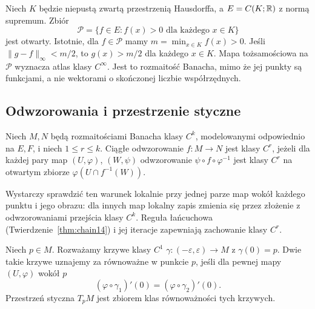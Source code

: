 \begin{przyklad}
\label{ex:fsg-positive-functions}
Niech $K$ będzie niepustą zwartą przestrzenią Hausdorffa,
a $E=C(K;\mathbb R)$ z normą supremum. Zbiór
\[
 \mathcal P=\{f\in E:f(x)>0\text{ dla każdego }x\in K\}
\]
jest otwarty. Istotnie, dla $f\in\mathcal P$ mamy
$m=\min_{x\in K}f(x)>0$. Jeśli $\|g-f\|_\infty<m/2$,
to $g(x)>m/2$ dla każdego $x\in K$. Mapa tożsamościowa
na $\mathcal P$ wyznacza atlas klasy $C^\infty$.
Jest to rozmaitość Banacha, mimo że jej punkty są funkcjami,
a nie wektorami o skończonej liczbie współrzędnych.
\end{przyklad}

\subsection{Odwzorowania i przestrzenie styczne}

\begin{definicja}
\label{def:fsg-smooth-map}
Niech $M,N$ będą rozmaitościami Banacha klasy $C^k$,
modelowanymi odpowiednio na $E,F$, i niech $1\le r\le k$.
Ciągłe odwzorowanie $f:M\to N$ jest klasy $C^r$, jeżeli
dla każdej pary map $(U,\varphi)$, $(W,\psi)$
odwzorowanie
$\psi\circ f\circ\varphi^{-1}$ jest klasy $C^r$
na otwartym zbiorze $\varphi(U\cap f^{-1}(W))$.
\end{definicja}

Wystarczy sprawdzić ten warunek lokalnie przy jednej parze
map wokół każdego punktu i jego obrazu: dla innych map
lokalny zapis zmienia się przez złożenie z odwzorowaniami
przejścia klasy $C^k$. Reguła łańcuchowa
(Twierdzenie~\ref{thm:chain14}) i jej iteracje zapewniają
zachowanie klasy $C^r$.

\begin{definicja}
\label{def:fsg-tangent}
Niech $p\in M$. Rozważamy krzywe klasy $C^1$
$\gamma:(-\varepsilon,\varepsilon)\to M$ z $\gamma(0)=p$.
Dwie takie krzywe uznajemy za równoważne w punkcie $p$,
jeśli dla pewnej mapy $(U,\varphi)$ wokół $p$
\[
 (\varphi\circ\gamma_1)'(0)
 =(\varphi\circ\gamma_2)'(0).
\]
Przestrzeń styczna $T_pM$ jest zbiorem klas równoważności
tych krzywych.
\end{definicja}

